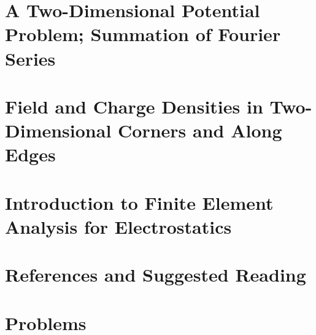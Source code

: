 \section{A Two-Dimensional Potential Problem; Summation of Fourier Series}

\section{Field and Charge Densities in Two-Dimensional Corners and Along Edges}

\section{Introduction to Finite Element Analysis for Electrostatics}


\section*{References and Suggested Reading}


\section*{Problems}

